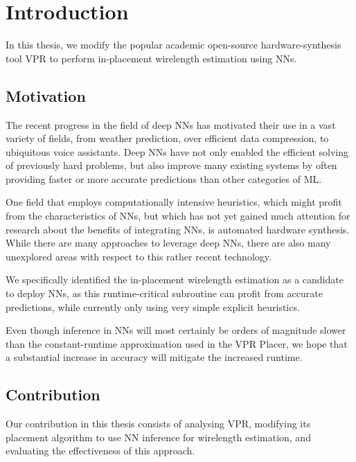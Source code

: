 
\chapter{Introduction}\label{ch:introduction}
\glsresetall %

In this thesis, we modify the popular academic open-source hardware-synthesis tool \gls{VPR}\cite{vtr8} to perform in-placement wirelength estimation using \glspl{NN}.

\section{Motivation}

The recent progress in the field of deep \glspl{NN} has motivated their use in a vast variety of fields, from weather prediction, over efficient data compression, to ubiquitous voice assistants. Deep \glspl{NN} have not only enabled the efficient solving of previously hard problems, but also improve many existing systems by often providing faster or more accurate predictions than other categories of \gls{ML}.

One field that employs computationally intensive heuristics, which might profit from the characteristics of \glspl{NN}, but which has not yet gained much attention for research about the benefits of integrating \glspl{NN}, is automated hardware synthesis. While there are many approaches to leverage deep \glspl{NN}, there are also many unexplored areas with respect to this rather recent technology.

We specifically identified the in-placement wirelength estimation as a candidate to deploy \glspl{NN}, as this runtime-critical subroutine can profit from accurate predictions, while currently only using very simple explicit heuristics.

Even though inference in \glspl{NN} will most certainly be orders of magnitude slower than the constant-runtime approximation used in the \gls{VPR} Placer, we hope that a substantial increase in accuracy will mitigate the increased runtime.

\section{Contribution}

Our contribution in this thesis consists of analysing \gls{VPR}, modifying its placement algorithm to use \gls{NN} inference for wirelength estimation, and evaluating the effectiveness of this approach.

